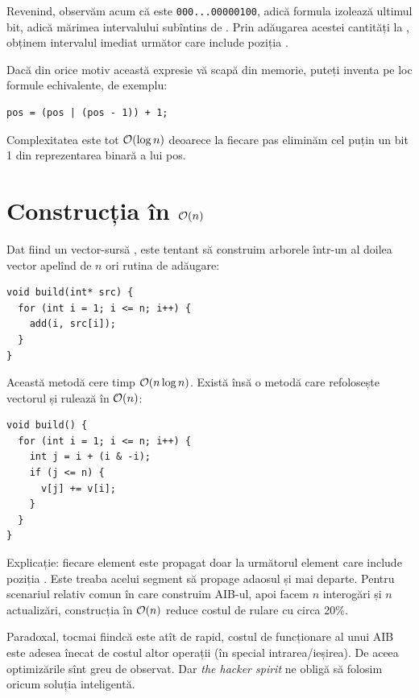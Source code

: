 \documentclass[../main.tex]{subfiles}
\begin{document}
Revenind, observăm acum că  este \texttt{000...00000100}, adică formula  izolează ultimul bit, adică mărimea intervalului subîntins de . Prin adăugarea acestei cantități la , obținem intervalul imediat următor care include poziția .

Dacă din orice motiv această expresie vă scapă din memorie, puteți inventa pe loc formule echivalente, de exemplu:

\begin{verbatim}
pos = (pos | (pos - 1)) + 1;
\end{verbatim}

Complexitatea este tot $\mathcal{O}(\log n)$ deoarece la fiecare pas eliminăm cel puțin un bit 1 din reprezentarea binară a lui pos.

\section{Construcția în \texorpdfstring{$\mathcal{O}(n)$}{O(n)}}

Dat fiind un vector-sursă , este tentant să construim arborele într-un al doilea vector apelînd de $n$ ori rutina de adăugare:

\begin{verbatim}
void build(int* src) {
  for (int i = 1; i <= n; i++) {
    add(i, src[i]);
  }
}
\end{verbatim}

Această metodă cere timp $\mathcal{O}(n \log n)$. Există însă o metodă care refolosește vectorul și rulează în $\mathcal{O}(n)$:

\begin{verbatim}
void build() {
  for (int i = 1; i <= n; i++) {
    int j = i + (i & -i);
    if (j <= n) {
      v[j] += v[i];
    }
  }
}
\end{verbatim}

Explicație: fiecare element  este propagat doar la următorul element  care include poziția . Este treaba acelui segment să propage adaosul și mai departe. Pentru scenariul relativ comun în care construim AIB-ul, apoi facem $n$ interogări și $n$ actualizări, construcția în $\mathcal{O}(n)$ reduce costul de rulare cu circa 20\%.

Paradoxal, tocmai fiindcă este atît de rapid, costul de funcționare al unui AIB este adesea înecat de costul altor operații (în special intrarea/ieșirea). De aceea optimizările sînt greu de observat. Dar \textit{the hacker spirit} ne obligă să folosim oricum soluția inteligentă.
\end{document}
